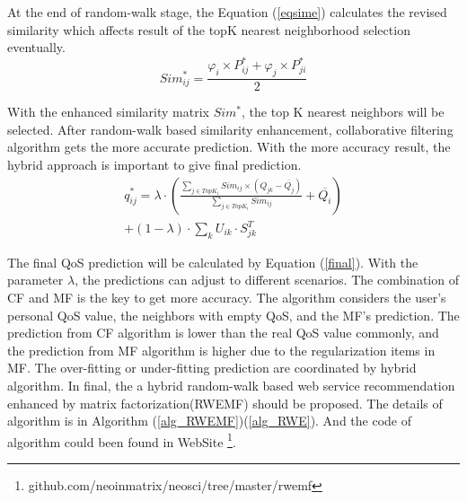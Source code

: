 \documentclass[conference]{IEEEtran}
\begin{document}
\par At the end of random-walk stage, the Equation (\ref{eqsime}) calculates the revised similarity which affects result of the topK nearest neighborhood selection\cite{hadad_tqos:_2010} eventually. 
\begin{equation}\label{eqsime} 
Sim_{ij}^{*}=\frac
{
\varphi_{i} \times P^{*}_{ij} + \varphi_{j} \times P^{*}_{ji}
}{2}
\end{equation}
\par With the enhanced similarity matrix $Sim^{*}$, the top K nearest neighbors will be selected. After random-walk based similarity enhancement, collaborative filtering algorithm gets the more accurate prediction. With the more accuracy result, the hybrid approach is important to give final prediction.
\begin{equation}
\begin{aligned}
q_{ij}^{*}= \lambda \cdot (
\frac{
  \sum_{j \in TopK_{i}}{Sim_{ij} \times (Q_{jk}-\overline{Q_{j}})}
}{\sum_{j \in TopK_{i}}{Sim_{ij}}
}+\overline{Q_{i}}
) \\ + (1-\lambda) \cdot \sum_{k}U_{ik} \cdot S_{jk}^{T}
\label{final}
\end{aligned}
\end{equation}
\par The final QoS prediction will be calculated by Equation (\ref{final}). With the parameter $\lambda$, the predictions can adjust to different scenarios. The combination of CF and MF is the key to get more accuracy. The algorithm considers the user's personal QoS value, the neighbors with empty QoS, and the MF's prediction. The prediction from CF algorithm is lower than the real QoS value commonly, and the prediction from MF algorithm is higher due to the regularization items in MF. The over-fitting or under-fitting prediction are coordinated by hybrid algorithm. In final, the a hybrid random-walk based web service recommendation enhanced by matrix factorization(RWEMF) should be proposed. The details of algorithm is in Algorithm (\ref{alg_RWEMF})(\ref{alg_RWE}). And the code of algorithm could been found in WebSite \footnote{github.com/neoinmatrix/neosci/tree/master/rwemf}.
\end{document}

